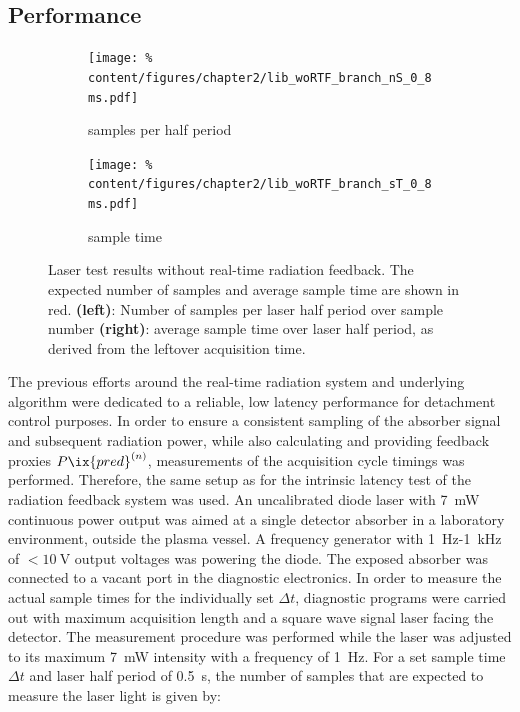         \subsection{Performance}\label{sec:drawbacks}%
%
            \begin{figure}[t]%
                \centering%
                \begin{subfigure}{0.48\textwidth}%
                    \texttt{[image: \%
                        content/figures/chapter2/lib\_woRTF\_branch\_nS\_0\_8ms.pdf]}%
                    \caption{samples per half period}
                \end{subfigure}%
                \hspace*{0.25cm}%
                \begin{subfigure}{0.48\textwidth}%
                    \texttt{[image: \%
                        content/figures/chapter2/lib\_woRTF\_branch\_sT\_0\_8ms.pdf]}%
                    \caption{sample time}
                \end{subfigure}%
                \caption{Laser test results without real-time radiation feedback. The expected number of samples and average sample time are shown in red. \textbf{(left)}: Number of samples per laser half period over sample number \textbf{(right)}: average sample time over laser half period, as derived from the leftover acquisition time.}\label{fig:woRTF_0.8ms}%
            \end{figure}%
%
            The previous efforts around the real-time radiation system and underlying algorithm were dedicated to a reliable, low latency performance for detachment control purposes. In order to ensure a consistent sampling of the absorber signal and subsequent radiation power, while also calculating and providing feedback proxies $P\ix{pred}^{\left(n\right)}$, measurements of the acquisition cycle timings was performed. Therefore, the same setup as for the intrinsic latency test of the radiation feedback system was used. An uncalibrated diode laser with \SI{7}{\milli\watt} continuous power output was aimed at a single detector absorber in a laboratory environment, outside the plasma vessel. A frequency generator with \SI{1}{\hertz}-\SI{1}{\kilo\hertz} of $<\SI{10}{\volt}$ output voltages was powering the diode. The exposed absorber was connected to a vacant port in the diagnostic electronics. In order to measure the actual sample times for the individually set $\Delta t$, diagnostic programs were carried out with maximum acquisition length and a square wave signal laser facing the detector. The measurement procedure was performed while the laser was adjusted to its maximum \SI{7}{\milli\watt} intensity with a frequency of \SI{1}{\hertz}. For a set sample time $\Delta t$ and laser half period of \SI{0.5}{\second}, the number of samples that are expected to measure the laser light is given by:%
